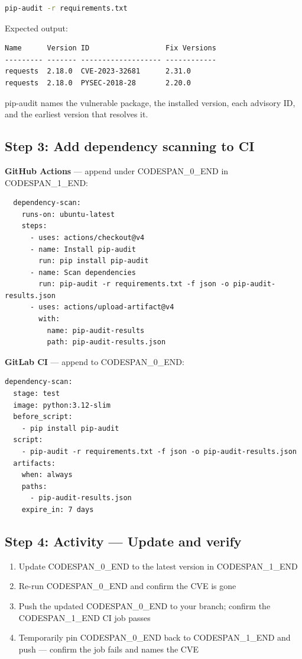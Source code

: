 \documentclass[11pt,a4paper]{book}
\begin{document}
\begin{lstlisting}[language=Bash]
pip-audit -r requirements.txt
\end{lstlisting}

Expected output:

\begin{lstlisting}
Name      Version ID                  Fix Versions
--------- ------- ------------------- ------------
requests  2.18.0  CVE-2023-32681      2.31.0
requests  2.18.0  PYSEC-2018-28       2.20.0
\end{lstlisting}

pip-audit names the vulnerable package, the installed version, each advisory ID, and the earliest version that resolves it.

\subsection{Step 3: Add dependency scanning to CI}

\textbf{GitHub Actions} --- append under CODESPAN\_0\_END in CODESPAN\_1\_END:

\begin{lstlisting}
  dependency-scan:
    runs-on: ubuntu-latest
    steps:
      - uses: actions/checkout@v4
      - name: Install pip-audit
        run: pip install pip-audit
      - name: Scan dependencies
        run: pip-audit -r requirements.txt -f json -o pip-audit-results.json
      - uses: actions/upload-artifact@v4
        with:
          name: pip-audit-results
          path: pip-audit-results.json
\end{lstlisting}

\textbf{GitLab CI} --- append to CODESPAN\_0\_END:

\begin{lstlisting}
dependency-scan:
  stage: test
  image: python:3.12-slim
  before_script:
    - pip install pip-audit
  script:
    - pip-audit -r requirements.txt -f json -o pip-audit-results.json
  artifacts:
    when: always
    paths:
      - pip-audit-results.json
    expire_in: 7 days
\end{lstlisting}

\subsection{Step 4: Activity --- Update and verify}

\begin{enumerate}
  \item Update CODESPAN\_0\_END to the latest version in CODESPAN\_1\_END
  \item Re-run CODESPAN\_0\_END and confirm the CVE is gone
  \item Push the updated CODESPAN\_0\_END to your branch; confirm the CODESPAN\_1\_END CI job passes
  \item Temporarily pin CODESPAN\_0\_END back to CODESPAN\_1\_END and push --- confirm the job fails and names the CVE
\end{enumerate}
\end{document}
